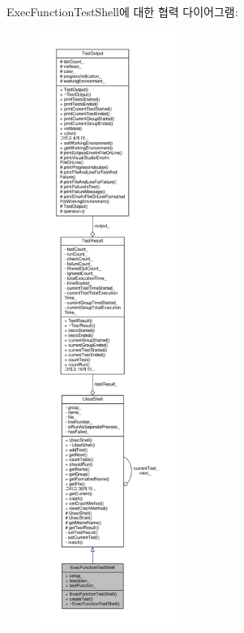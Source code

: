 Exec\+Function\+Test\+Shell에 대한 협력 다이어그램\+:
\nopagebreak
\begin{figure}[H]
\begin{center}
\leavevmode
\includegraphics[height=550pt]{class_exec_function_test_shell__coll__graph}
\end{center}
\end{figure}
